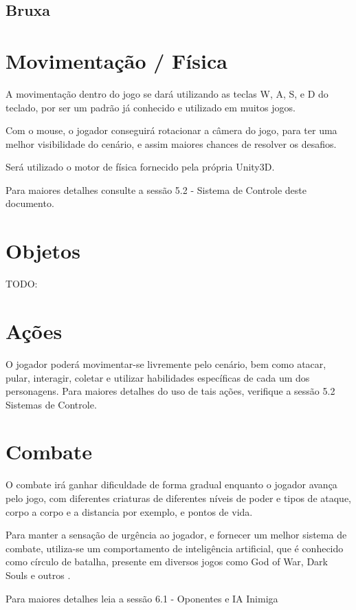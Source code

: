 \subsection{Bruxa}


\section{Movimentação / Física}
A movimentação dentro do jogo se dará utilizando as teclas W, A, S, e D do teclado, por ser um padrão já conhecido e utilizado em muitos jogos.

Com o mouse, o jogador conseguirá rotacionar a câmera do jogo, para ter uma melhor visibilidade do cenário, e assim maiores chances de resolver os desafios.

Será utilizado o motor de física fornecido pela própria Unity3D.

Para maiores detalhes consulte a sessão 5.2 - Sistema de Controle deste documento.

\section{Objetos}

TODO:

\section{Ações}
O jogador poderá movimentar-se livremente pelo cenário, bem como atacar, pular, interagir, coletar e utilizar habilidades específicas de cada um dos personagens. Para maiores detalhes do uso de tais ações, verifique  a sessão 5.2 Sistemas de Controle.

\section{Combate}
O combate irá ganhar dificuldade de forma gradual enquanto o jogador avança pelo jogo, com diferentes criaturas de diferentes níveis de poder e tipos de ataque, corpo a corpo e a distancia por exemplo, e pontos de vida. 

Para manter a sensação de urgência ao jogador, e fornecer um melhor sistema de combate, utiliza-se um comportamento de inteligência artificial, que é conhecido como círculo de batalha, presente em diversos jogos como God of War, Dark Souls e outros \cite{BattleCi}.

Para maiores detalhes leia a sessão 6.1 - Oponentes e IA Inimiga

